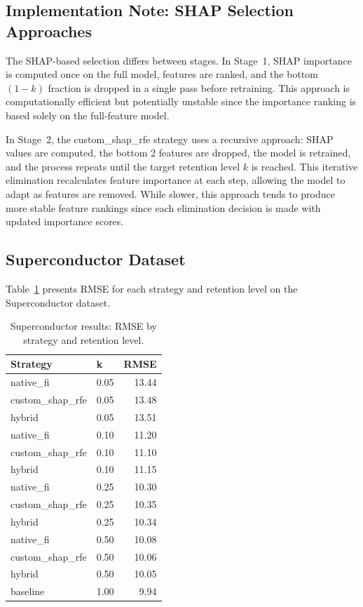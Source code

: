 \subsection{Implementation Note: SHAP Selection Approaches}

The SHAP-based selection differs between stages. In Stage~1, SHAP importance is computed once on the full model, features are ranked, and the bottom $(1-k)$ fraction is dropped in a single pass before retraining. This approach is computationally efficient but potentially unstable since the importance ranking is based solely on the full-feature model.

In Stage~2, the custom\_shap\_rfe strategy uses a recursive approach: SHAP values are computed, the bottom 2 features are dropped, the model is retrained, and the process repeats until the target retention level $k$ is reached. This iterative elimination recalculates feature importance at each step, allowing the model to adapt as features are removed. While slower, this approach tends to produce more stable feature rankings since each elimination decision is made with updated importance scores.

\subsection{Superconductor Dataset}

Table~\ref{tab:stage2_super} presents RMSE for each strategy and retention level on the Superconductor dataset.

\begin{table}[ht!]
\centering
\caption{Superconductor results: RMSE by strategy and retention level.}
\label{tab:stage2_super}
\begin{tabular}{llr}
\toprule
\textbf{Strategy} & \textbf{k} & \textbf{RMSE} \\
\midrule
native\_fi & 0.05 & 13.44 \\
custom\_shap\_rfe & 0.05 & 13.48 \\
hybrid & 0.05 & 13.51 \\
\midrule
native\_fi & 0.10 & 11.20 \\
custom\_shap\_rfe & 0.10 & 11.10 \\
hybrid & 0.10 & 11.15 \\
\midrule
native\_fi & 0.25 & 10.30 \\
custom\_shap\_rfe & 0.25 & 10.35 \\
hybrid & 0.25 & 10.34 \\
\midrule
native\_fi & 0.50 & 10.08 \\
custom\_shap\_rfe & 0.50 & 10.06 \\
hybrid & 0.50 & 10.05 \\
\midrule
baseline & 1.00 & 9.94 \\
\bottomrule
\end{tabular}
\end{table}

